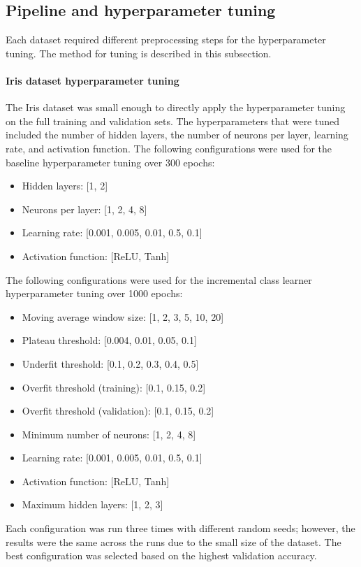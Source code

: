 \documentclass[conference]{IEEEtran}
\begin{document}
\subsection{Pipeline and hyperparameter tuning}
Each dataset required different preprocessing steps for the hyperparameter tuning. The method for tuning is described in this subsection.

\paragraph{Iris dataset hyperparameter tuning}
The Iris dataset was small enough to directly apply the hyperparameter tuning on the full training and validation sets. The hyperparameters that were tuned included the number of hidden layers, the number of 
neurons per layer, learning rate, and activation function. The following configurations were used for the baseline hyperparameter tuning over 300 epochs:
\begin{itemize}
\item Hidden layers: [1, 2]
\item Neurons per layer: [1, 2, 4, 8]
\item Learning rate: [0.001, 0.005, 0.01, 0.5, 0.1]
\item Activation function: [ReLU, Tanh]
\end{itemize}
 The following configurations were used for the incremental class learner hyperparameter tuning over 1000 epochs:
\begin{itemize}
\item Moving average window size: [1, 2, 3, 5, 10, 20]
\item Plateau threshold: [0.004, 0.01, 0.05, 0.1]
\item Underfit threshold: [0.1, 0.2, 0.3, 0.4, 0.5]
\item Overfit threshold (training): [0.1, 0.15, 0.2]
\item Overfit threshold (validation): [0.1, 0.15, 0.2]
\item Minimum number of neurons: [1, 2, 4, 8]
\item Learning rate: [0.001, 0.005, 0.01, 0.5, 0.1]
\item Activation function: [ReLU, Tanh]
\item Maximum hidden layers: [1, 2, 3]
\end{itemize}
Each configuration was run three times with different random seeds; however, the results were the same across the runs due to 
the small size of the dataset. The best configuration was selected based on the highest validation accuracy.
\end{document}
